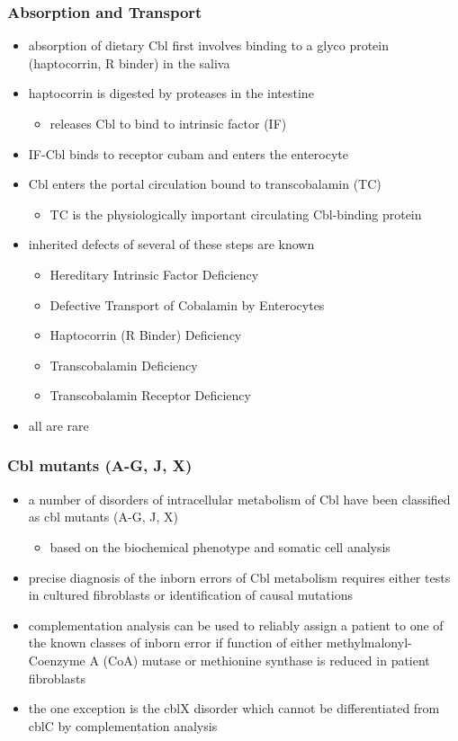 \documentclass{scrartcl}
\begin{document}
\subsubsection{Absorption and Transport}
\label{sec:orgacb1b7c}
\begin{itemize}
\item absorption of dietary Cbl first involves binding to a glyco protein
(haptocorrin, R binder) in the saliva
\item haptocorrin is digested by proteases in the intestine
\begin{itemize}
\item releases Cbl to bind to intrinsic factor (IF)
\end{itemize}
\item IF-Cbl binds to receptor cubam and enters the enterocyte
\item Cbl enters the portal circulation bound to transcobalamin (TC)
\begin{itemize}
\item TC is the physiologically important circulating Cbl-binding
protein
\end{itemize}
\item inherited defects of several of these steps are known
\begin{itemize}
\item Hereditary Intrinsic Factor Deficiency
\item Defective Transport of Cobalamin by Enterocytes
\item Haptocorrin (R Binder) Deficiency
\item Transcobalamin Deficiency
\item Transcobalamin Receptor Deficiency
\end{itemize}
\item all are rare
\end{itemize}
\subsubsection{Cbl mutants (A-G, J, X)}
\label{sec:orgf25c787}
\begin{itemize}
\item a number of disorders of intracellular metabolism of Cbl have been
classified as cbl mutants (A-G, J, X)
\begin{itemize}
\item based on the biochemical phenotype and somatic cell analysis
\end{itemize}
\item precise diagnosis of the inborn errors of Cbl metabolism requires
either tests in cultured fibroblasts or identification of causal
mutations
\item complementation analysis can be used to reliably assign a patient to
one of the known classes of inborn error if function of either
methylmalonyl-Coenzyme A (CoA) mutase or methionine synthase is
reduced in patient fibroblasts
\item the one exception is the cblX disorder which cannot be
differentiated from cblC by complementation analysis
\end{itemize}
\end{document}
